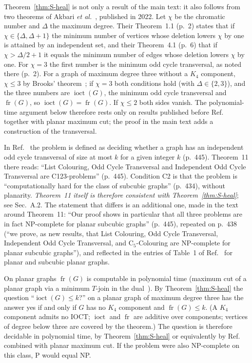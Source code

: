\documentclass[aps,pre,onecolumn,nofootinbib]{revtex4-2}
\theoremstyle{remark}
\newcommand{\fr}{\operatorname{fr}}
\newcommand{\ioct}{\operatorname{ioct}}
\begin{document}
Theorem~\ref{thm:S-heal} is not only a result of the main text: it also follows from two theorems
of Akbari \emph{et al.}~\cite{Akbari2022}, published in 2022. Let $\chi$ be the chromatic number
and $\Delta$ the maximum degree. Their Theorem~1.1 (p.~2) states that if $\chi\in\{\Delta,\Delta+1\}$ the
minimum number of vertices whose deletion lowers $\chi$ by one is attained by an independent set,
and their Theorem~4.1 (p.~6) that if $\chi>\Delta/2+1$ it equals the minimum number of edges whose
deletion lowers $\chi$ by one. For $\chi=3$ the first number is the minimum odd cycle transversal,
as noted there (p.~2). For a graph of maximum degree three without a $K_4$ component,
$\chi\le3$ by Brooks' theorem~\cite{Brooks1941}; if $\chi=3$ both conditions hold (with
$\Delta\in\{2,3\}$), and the three numbers are $\ioct(G)$, the minimum odd cycle transversal and
$\fr(G)$, so $\ioct(G)=\fr(G)$. If $\chi\le2$ both sides vanish. The polynomial-time argument below therefore
rests only on results published before Ref.~\cite{Johnson2025} together with planar maximum cut; the
proof in the main text adds a construction of the transversal.

In Ref.~\cite{Johnson2025} the problem is defined as deciding whether a graph has an independent
odd cycle transversal of size at most $k$ for a given integer $k$ (p.~445). Theorem~11 there reads:
``List Colouring, Odd Cycle Transversal and Independent Odd Cycle Transversal are C123-problems''
(p.~445). Condition C2 is that the problem is ``computationally hard for the class of subcubic
graphs'' (p.~434), without planarity. \emph{Theorem~11 itself is therefore consistent with
Theorem~\ref{thm:S-heal}}; see Sec.~A.2. The statement that differs is an additional one, made
in the text around Theorem~11: ``Our proof shows in particular that all three problems are in
fact NP-complete for planar subcubic graphs'' (p.~445), repeated on p.~438 (``we prove, as new
results, that List Colouring, Odd Cycle Transversal, Independent Odd Cycle Transversal, and
C$_5$-Colouring are NP-complete for planar subcubic graphs''), and reflected in the entries of
Table~1 of Ref.~\cite{Johnson2025} for planar and subcubic planar graphs.

On planar graphs $\fr(G)$ is computable in polynomial time (maximum cut of a planar graph via a
minimum $T$-join in the dual~\cite{Hadlock1975,Barahona1982}). By Theorem~\ref{thm:S-heal} the
question ``$\ioct(G)\le k$?'' on a planar graph of maximum degree three has the answer yes if and
only if $G$ has no $K_4$ component and $\fr(G)\le k$. (A $K_4$ component admits no IOCT; $\ioct$
and $\fr$ are additive over components; vertices of degree below three are covered by the
theorem.) The question is therefore decidable in polynomial time, by Theorem~\ref{thm:S-heal} or
equivalently by Ref.~\cite{Akbari2022} combined with planar maximum cut. If the problem were also
NP-complete on this class, P would equal NP.
\end{document}
